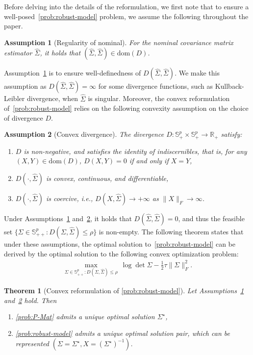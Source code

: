 \documentclass[11pt]{article}
\def\R{\mathbb{R}}
\def\S{\mathbb{S}}
\def\PSD{{\S^k_{++}}}
\newtheorem{theorem}{Theorem}
\newtheorem{assumption}{Assumption}
\newcommand{\opt}{^\star}
\def\R{\mathbb{R}}
\def\S{\mathbb{S}}
\def\PSD{{\S^p_{+}}}
\def\PD{{\S^p_{++}}}
\newcommand{\wh}{\widehat}
\begin{document}
Before delving into the details of the reformulation, we first note that to ensure a well-posed~\eqref{prob:robust-model} problem, we assume the following throughout the paper.
\begin{assumption}[Regularity of nominal]\label{ass:regularity-nominal}
    For the nominal covariance matrix estimator $\wh\Sigma$, it holds that $(\wh\Sigma,\wh\Sigma)\in\mathrm{dom}(D)$.
\end{assumption}
Assumption~\ref{ass:regularity-nominal} is to ensure well-definedness of  $D(\wh\Sigma,\wh\Sigma)$. We make this assumption as $D(\wh\Sigma,\wh\Sigma)=\infty$ for some divergence functions, such as Kullback-Leibler divergence, when $\wh\Sigma$ is singular. 
Moreover, the convex reformulation of~\eqref{prob:robust-model} relies on the following convexity assumption on the choice of divergence $D$.
\begin{assumption}[Convex divergence]\label{ass:convex-divergence}
    The divergence $D:\PSD\times \PSD\to \R_+$ satisfy:
\begin{enumerate}[label=(\roman*)]
        \item $D$ is non-negative, and satisfies the identity of indiscernibles, that is, for any $(X,Y)\in\mathrm{dom}(D)$, $D(X,Y)=0$ if and only if $X=Y$,
        \item $D(\cdot,\wh\Sigma)$ is convex, continuous, and differentiable,
        \item $D(\cdot, \wh\Sigma)$ is coercive, i.e., $D(X,\wh\Sigma)\to +\infty$ as $\|X\|_F \to \infty$.
    \end{enumerate}
\end{assumption}
Under Assumptions~\ref{ass:regularity-nominal} and~\ref{ass:convex-divergence}, it holds that $D(\wh\Sigma,\wh\Sigma)=0$, and thus the feasible set $\{\Sigma\in\PD: D(\Sigma, \widehat{\Sigma})\leq  \rho\}$ is non-empty.
The following theorem states that under these assumptions, the optimal solution to~\eqref{prob:robust-model} can be
derived by the optimal solution to the following convex optimization problem:
\begin{align}\tag{P-Mat}\label{prob:P-Mat}
\max_{\Sigma\in\PD: D(\Sigma, \widehat{\Sigma})\leq  \rho}~ \log\det \Sigma - \frac{1}{2}\tau \|\Sigma\|_F^2.
\end{align}

\begin{theorem}[Convex reformulation of \eqref{prob:robust-model}]
\label{thm:convex-reform}
    Let Assumptions~\ref{ass:regularity-nominal} and~\ref{ass:convex-divergence} hold. Then
    \begin{enumerate}[label=(\roman*)]
        \item \eqref{prob:P-Mat} admits a unique optimal solution $\Sigma\opt$,
        \item \eqref{prob:robust-model} admits a unique optimal solution pair, which can be represented $(\Sigma=\Sigma\opt, X=(\Sigma\opt)^{-1})$.
    \end{enumerate}
\end{theorem}
\end{document}
